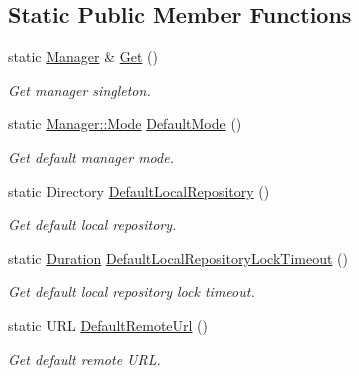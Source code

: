 \subsection*{Static Public Member Functions}
\begin{DoxyCompactItemize}
\item 
static \hyperlink{classostk_1_1physics_1_1coord_1_1frame_1_1provider_1_1iers_1_1_manager}{Manager} \& \hyperlink{classostk_1_1physics_1_1coord_1_1frame_1_1provider_1_1iers_1_1_manager_a1ce6a052108fc9345997b61200d33a09}{Get} ()
\begin{DoxyCompactList}\small\item\em Get manager singleton. \end{DoxyCompactList}\item 
static \hyperlink{classostk_1_1physics_1_1coord_1_1frame_1_1provider_1_1iers_1_1_manager_a3a8dd1081d1094069417687b4a3f16ba}{Manager\+::\+Mode} \hyperlink{classostk_1_1physics_1_1coord_1_1frame_1_1provider_1_1iers_1_1_manager_a0a1975c6e7c3990f6a4f679415f4065e}{Default\+Mode} ()
\begin{DoxyCompactList}\small\item\em Get default manager mode. \end{DoxyCompactList}\item 
static Directory \hyperlink{classostk_1_1physics_1_1coord_1_1frame_1_1provider_1_1iers_1_1_manager_a13ba1984f851041d69026b85e520c02d}{Default\+Local\+Repository} ()
\begin{DoxyCompactList}\small\item\em Get default local repository. \end{DoxyCompactList}\item 
static \hyperlink{classostk_1_1physics_1_1time_1_1_duration}{Duration} \hyperlink{classostk_1_1physics_1_1coord_1_1frame_1_1provider_1_1iers_1_1_manager_a00b7a5114cd80fbff515dd7af9381519}{Default\+Local\+Repository\+Lock\+Timeout} ()
\begin{DoxyCompactList}\small\item\em Get default local repository lock timeout. \end{DoxyCompactList}\item 
static U\+RL \hyperlink{classostk_1_1physics_1_1coord_1_1frame_1_1provider_1_1iers_1_1_manager_aa1ca4334d5652c6533a9b8a093845836}{Default\+Remote\+Url} ()
\begin{DoxyCompactList}\small\item\em Get default remote U\+RL. \end{DoxyCompactList}\end{DoxyCompactItemize}



